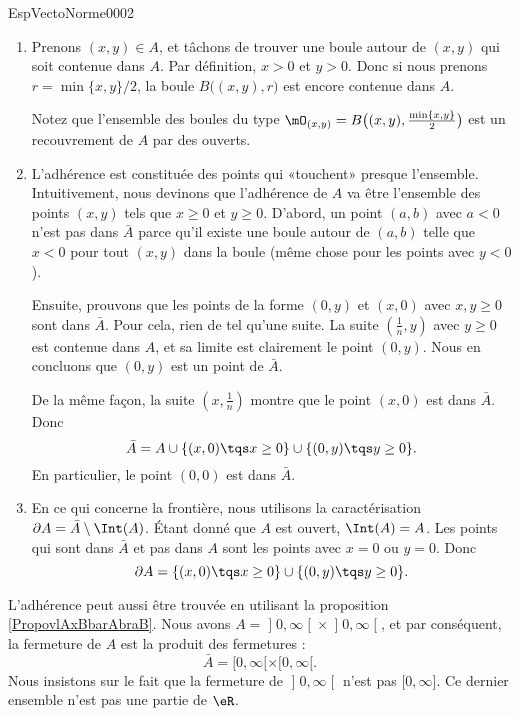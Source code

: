 \begin{corrige}{EspVectoNorme0002}

	\begin{enumerate}
		\item

			Prenons $(x,y)\in A$, et tâchons de trouver une boule autour de $(x,y)$ qui soit contenue dans $A$. Par définition, $x>0$ et $y>0$. Donc si nous prenons $r=\min\{ x,y \}/2$, la boule $B\big( (x,y),r \big)$ est encore contenue dans $A$.

			Notez que l'ensemble des boules du type $\mO_{(x,y)}=B\big( (x,y),\frac{ \min\{ x,y \} }{ 2 } \big)$ est un recouvrement de $A$ par des ouverts.

		\item		
			L'adhérence est constituée des points qui «touchent» presque l'ensemble. Intuitivement, nous devinons que l'adhérence de $A$ va être l'ensemble des points $(x,y)$ tels que $x\geq 0$ et $y\geq 0$. D'abord, un point $(a,b)$ avec $a<0$ n'est pas dans $\bar A$ parce qu'il existe une boule autour de $(a,b)$ telle que $x<0$ pour tout $(x,y)$ dans la boule (même chose pour les points avec $y<0$).

			Ensuite, prouvons que les points de la forme $(0,y)$ et $(x,0)$ avec $x,y\geq 0$ sont dans $\bar A$. Pour cela, rien de tel qu'une suite. La suite $(\frac{1}{ n },y)$ avec $y\geq 0$ est contenue dans $A$, et sa limite est clairement le point $(0,y)$. Nous en concluons que $(0,y)$ est un point de $\bar A$.

			De la même façon, la suite $(x,\frac{1}{ n })$ montre que le point $(x,0)$ est dans $\bar A$. Donc
			\begin{equation}
				\bar A=A\cup\{ (x,0)\tqs x\geq 0 \}\cup\{ (0,y)\tqs y\geq 0\}.
			\end{equation}
			En particulier, le point $(0,0)$ est dans $\bar A$.
			
		\item
			En ce qui concerne la frontière, nous utilisons la caractérisation $\partial A=\bar A\setminus\Int(A)$. Étant donné que $A$ est ouvert, $\Int(A)=A$. Les points qui sont dans $\bar A$ et pas dans $A$ sont les points avec $x=0$ ou $y=0$. Donc
			\begin{equation}
				\partial A=\{ (x,0)\tqs x\geq 0 \}\cup\{ (0,y)\tqs y\geq 0\}.
			\end{equation}

	\end{enumerate}

	L'adhérence peut aussi être trouvée en utilisant la proposition \ref{PropovlAxBbarAbraB}. Nous avons $A=\mathopen] 0 , \infty \mathclose[\times\mathopen] 0 , \infty \mathclose[$, et par conséquent, la fermeture de $A$ est la produit des fermetures :
	\begin{equation}
		\bar A=\mathopen[ 0 , \infty [\times\mathopen[ 0 , \infty [.
	\end{equation}
	Nous insistons sur le fait que la fermeture de $\mathopen] 0 , \infty \mathclose[$ n'est pas $\mathopen[ 0 , \infty \mathclose]$. Ce dernier ensemble n'est pas une partie de $\eR$.
\end{corrige}
